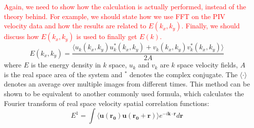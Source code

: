 \documentclass[twocolumn,aps,prx,amsmath,amssymb,longbibliography]{revtex4-2}
\begin{document}
\textcolor{red}{Again, we need to show how the calculation is actually performed, instead of the theory behind. For example, we should state how we use FFT on the PIV velocity data and how the results are related to $E(k_x,k_y)$. Finally, we should discuss how $E(k_x,k_y)$ is used to finally get $E(k)$.}
\begin{equation}
E(k_x, k_y) = \frac{\langle u_k(k_x, k_y)u^*_k(k_x, k_y)+v_k(k_x, k_y)v_k^*(k_x, k_y)\rangle}{2A}
\end{equation}
where $E$ is the energy density in $k$ space, $u_k$ and $v_k$ are $k$ space velocity fields, $A$ is the real space area of the system and $^*$ denotes the complex conjugate. The $\langle\cdot\rangle$ denotes an average over multiple images from different times. This method can be shown to be equivalent to another commonly used formula, which calculates the Fourier transform of real space velocity spatial correlation functions:
\begin{equation}
E^1 = \int \langle \boldsymbol{u}(\boldsymbol{r_0}) \boldsymbol{u}(\boldsymbol{r_0}+\boldsymbol{r}) \rangle
e^{-i\boldsymbol{k}\cdot\boldsymbol{r}} d\boldsymbol{r}
\end{equation}
\end{document}
